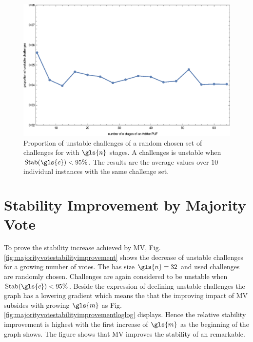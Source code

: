 \begin{figure}[ht]
\includegraphics[width=1.00\textwidth]{images/stages-stab-simulation.eps}
\caption{Proportion of unstable challenges of a random chosen set of challenges for \apufs with $\gls{n}$ stages. 
A challenges is unstable when $\Stab(\gls{c}) < 95 \%$. 
The results are the average values over $10$ individual \puf instances with the same challenge set.} 
\label{fig:arbiterstabilities}
\end{figure}


\section{Stability Improvement by Majority Vote}
\label{sec:stabilityimprovementbymajorityvote}

To prove the stability increase achieved by \ac{MV}, Fig. \ref{fig:majorityvotestabilityimprovement} shows the decrease of unstable challenges for a growing number of votes.
The \mpuf has size $\gls{n} = 32$ and used challenges are randomly chosen.
Challenges are again considered to be unstable when $\Stab(\gls{c}) < 95 \%$.
Beside the expression of declining unstable challenges the graph has a lowering gradient which means the that the improving impact of \ac{MV} subsides with growing $\gls{m}$ as Fig. \ref{fig:majorityvotestabilityimprovementloglog} displays.
Hence the relative stability improvement is highest with the first increase of $\gls{m}$ as the beginning of the graph shows.
The figure shows that \ac{MV} improves the stability of an \apuf remarkable. 

